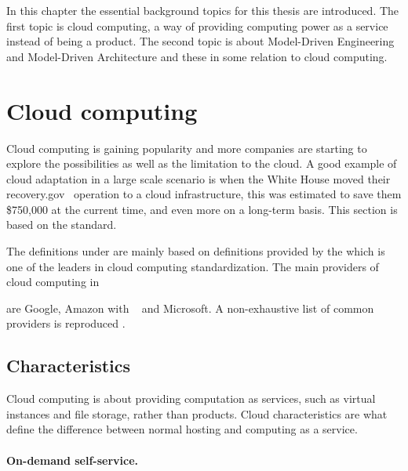 
In this chapter the essential background topics for this thesis are introduced.
The first topic is cloud computing, a way of providing computing power as a service
instead of being a product.
The second topic is about Model-Driven Engineering and Model-Driven Architecture
and these in some relation to cloud computing.

\section{Cloud computing}


Cloud computing is gaining popularity and more companies are starting 
to explore the possibilities as well as the limitation to the cloud.
A good example of cloud adaptation in a large scale scenario is when
the White House moved their recovery.gov~\cite{recovery} operation to
a cloud infrastructure, this was estimated to save them \$750,000
at the current time, and even more on a long-term basis.
This section is based on the  standard.

The definitions under are mainly based on definitions provided by 
the  which is one of the leaders in cloud computing standardization.
The main providers of cloud computing in \date{April 2012}
are Google, Amazon with ~\cite{aws} and Microsoft.
A non-exhaustive list of common providers is reproduced .

\subsection{Characteristics}

Cloud computing is about providing computation as services\cite{nist:mell11}, 
such as virtual instances and file storage, rather than products. 
Cloud characteristics are what define
the difference between normal hosting and computing as a service.

\paragraph{On-demand self-service.} 


